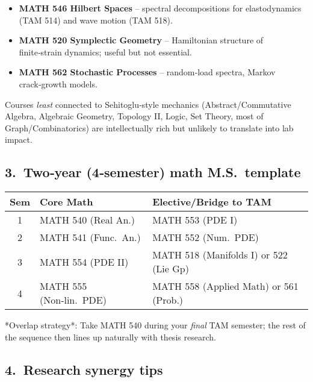 \documentclass[12pt]{article}
\theoremstyle{definition} %
\theoremstyle{plain} %
\begin{document}
\begin{itemize}
  \item \textbf{MATH 546 Hilbert Spaces} – spectral decompositions for
        elastodynamics (TAM 514) and wave motion (TAM 518).
  \item \textbf{MATH 520 Symplectic Geometry} – Hamiltonian structure of
        finite‑strain dynamics; useful but not essential.
  \item \textbf{MATH 562 Stochastic Processes} – random‑load spectra,
        Markov crack‑growth models.
\end{itemize}

\noindent
Courses \emph{least} connected to Sehitoglu‑style mechanics  
(Abstract/Commutative Algebra, Algebraic Geometry, Topology II, Logic,
Set Theory, most of Graph/Combinatorics) are intellectually rich but
unlikely to translate into lab impact.

\subsection*{3.\  Two‑year (4‑semester) math M.S.\ template}

\begin{center}
\begin{tabular}{@{}cll@{}}
\toprule
\textbf{Sem} & \textbf{Core Math} & \textbf{Elective/Bridge to TAM} \\
\midrule
1 & MATH 540 (Real An.) & MATH 553 (PDE I) \\
2 & MATH 541 (Func.\ An.) & MATH 552 (Num.\ PDE) \\
3 & MATH 554 (PDE II) & MATH 518 (Manifolds I) or 522 (Lie Gp) \\
4 & MATH 555 (Non‑lin.\ PDE) & MATH 558 (Applied Math) or 561 (Prob.)\\
\bottomrule
\end{tabular}
\end{center}

\noindent
*Overlap strategy*:  
Take MATH 540 during your \emph{final} TAM semester; the rest of the
sequence then lines up naturally with thesis research.

\subsection*{4.\  Research synergy tips}
\end{document}
